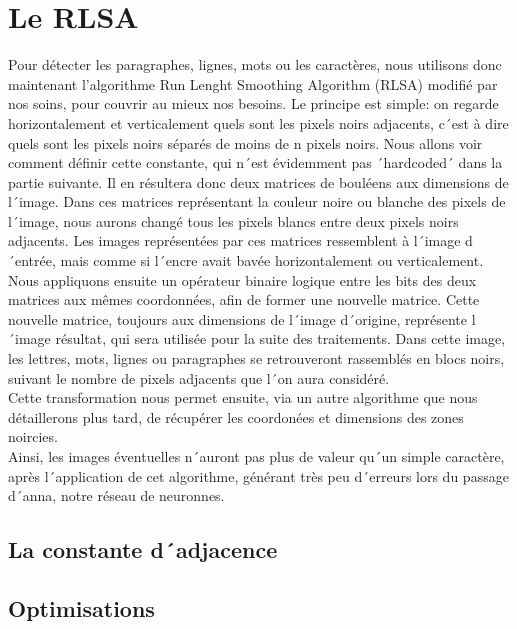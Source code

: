 \section{Le RLSA}

Pour détecter les paragraphes, lignes, mots ou les caractères, nous utilisons donc maintenant l'algorithme Run Lenght Smoothing Algorithm (RLSA) modifié par nos soins, pour couvrir au mieux nos besoins. Le principe est simple: on regarde horizontalement et verticalement quels sont les pixels noirs adjacents, c´est à dire quels sont les pixels noirs séparés de moins de n pixels noirs. Nous allons voir comment définir cette constante, qui n´est évidemment pas ´hardcoded´ dans la partie suivante. Il en résultera donc deux matrices de bouléens aux dimensions de l´image. Dans ces matrices représentant la couleur noire ou blanche des pixels de l´image, nous aurons changé tous les pixels blancs entre deux pixels noirs adjacents. Les images représentées par ces matrices ressemblent à l´image d´entrée, mais comme si l´encre avait bavée horizontalement ou verticalement.\\
Nous appliquons ensuite un opérateur binaire logique entre les bits des deux matrices aux mêmes coordonnées, afin de former une nouvelle matrice. Cette nouvelle matrice, toujours aux dimensions de l´image d´origine, représente l´image résultat, qui sera utilisée pour la suite des traitements. Dans cette image, les lettres, mots, lignes ou paragraphes se retrouveront rassemblés en blocs noirs, suivant le nombre de pixels adjacents que l´on aura considéré.\\
Cette transformation nous permet ensuite, via un autre algorithme que nous détaillerons plus tard, de récupérer les coordonées et dimensions des zones noircies.\\
Ainsi, les images éventuelles n´auront pas plus de valeur qu´un simple caractère, après l´application de cet algorithme, générant très peu d´erreurs lors du passage d´anna, notre réseau de neuronnes.


\subsection{La constante d´adjacence}


\subsection{Optimisations}

